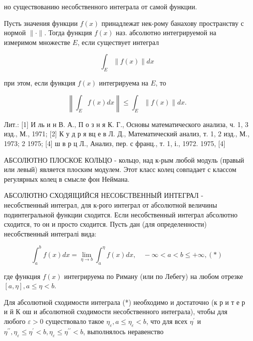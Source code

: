 \documentclass[10pt]{article}
\begin{document}
но существованию несобственного интеграла от самой функции.



Пусть значения функции $f(x)$ принадлежат нек-рому банахову пространству с нормой $\|\cdot\|$. Тогда функция $f(x)$ наз. абсолютно интегрируемой на измеримом множестве $E$, если существует интеграл



\[

\int_{E}\|f(x)\| d x

\]



при этом, если функция $f(x)$ интегрируема на $E$, то



\[

\left\|\int_{E} f(x) d x\right\| \leqslant \int_{E}\|f(x)\| d x .

\]



Лит.: [1] И ль и н В. А., П о з н я К. Г., Основы математического анализа, ч. 1, 3 изд., М., 1971; [2] К у д р я вц е в Л. Д., Математический анализ, т. 1, 2 изд., М., 1973; 2 1975; [4] ш в р ц Л., Анализ, пер. с франц., т. 1, і., 1972. 1975, [4]



АБСОЛЮТНО ПЛОСКОЕ КОЛЬЦО - кольцо, над к-рым любой модуль (правый или левый) является плоским модулем. Этот класс колец совпадает с классом регулярных колец в смысле фон Неймана.



АБСОЛЮТНО СХОДЯІЦИЙСЯ НЕСОБСТВЕННЫЙ ИНТЕГРАЛ - несобственный интеграл, для к-рого интеграл от абсолютной величины подинтегральной функции сходится. Если несобственный интеграл абсолютно сходится, то он и просто сходится. Пусть дан (для определенности) несобственный интегралі вида:



\[

\int_{a}^{b} f(x) d x=\lim _{\eta \rightarrow b} \int_{a}^{\eta} f(x) d x, \quad-\infty<a<b \leqslant+\infty,(*)

\]



где функция $f(x)$ интегрируема по Риману (или по Лебегу) на любом отрезке $[a, \eta], a \leqslant \eta<b$.



Для абсолютной сходимости интеграла (*) необходимо и достаточно (к р и т е р и й К ош и абсолютной сходимости несобственного интеграла), чтобы для любого $\varepsilon>0$ существовало такое $\eta_{\varepsilon}, a \leqslant \eta_{\varepsilon}<b$, что для всех $\eta^{\prime}$ и $\eta^{\prime \prime}, \eta_{\varepsilon} \leqslant \eta^{\prime}<b, \eta_{\varepsilon} \leqslant \eta^{\prime \prime}<b$, выполнялось неравенство
\end{document}

